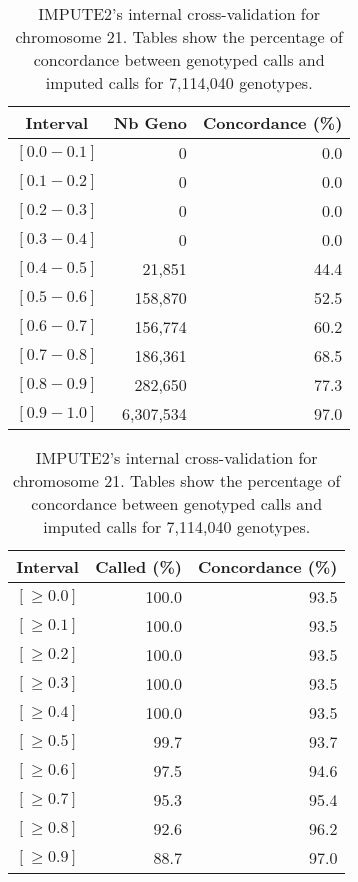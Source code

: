\documentclass[10pt,twoside,english]{scrartcl}
\begin{document}
\begin{table}[H]
\protect\caption{IMPUTE2's internal cross-validation for chromosome 21. Tables show the
percentage of concordance between genotyped calls and imputed calls
for 7,114,040 genotypes.\label{tab:cross_validation_chr_21}}

\centering

\begin{tabular}{crr}
\hline 
\multicolumn{1}{c}{\textbf{Interval}}
 & \multicolumn{1}{c}{\textbf{Nb Geno}}
 & \multicolumn{1}{c}{\textbf{Concordance (\%)}}
\\
\hline 

$[0.0-0.1]$ & 0 & 0.0\\
$[0.1-0.2]$ & 0 & 0.0\\
$[0.2-0.3]$ & 0 & 0.0\\
$[0.3-0.4]$ & 0 & 0.0\\
$[0.4-0.5]$ & 21,851 & 44.4\\
$[0.5-0.6]$ & 158,870 & 52.5\\
$[0.6-0.7]$ & 156,774 & 60.2\\
$[0.7-0.8]$ & 186,361 & 68.5\\
$[0.8-0.9]$ & 282,650 & 77.3\\
$[0.9-1.0]$ & 6,307,534 & 97.0\\
\hline 
\end{tabular}
\hfill
\begin{tabular}{crr}
\hline 
\multicolumn{1}{c}{\textbf{Interval}}
 & \multicolumn{1}{c}{\textbf{Called (\%)}}
 & \multicolumn{1}{c}{\textbf{Concordance (\%)}}
\\
\hline 

$[\geq 0.0]$ & 100.0 & 93.5\\
$[\geq 0.1]$ & 100.0 & 93.5\\
$[\geq 0.2]$ & 100.0 & 93.5\\
$[\geq 0.3]$ & 100.0 & 93.5\\
$[\geq 0.4]$ & 100.0 & 93.5\\
$[\geq 0.5]$ & 99.7 & 93.7\\
$[\geq 0.6]$ & 97.5 & 94.6\\
$[\geq 0.7]$ & 95.3 & 95.4\\
$[\geq 0.8]$ & 92.6 & 96.2\\
$[\geq 0.9]$ & 88.7 & 97.0\\
\hline 
\end{tabular}


\end{table}
\end{document}
